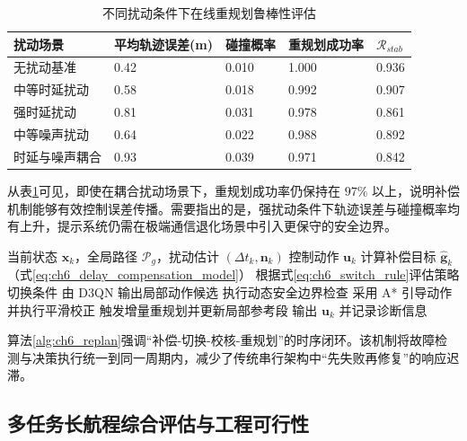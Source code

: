 \begin{table}[H]
\centering
\small
\caption{不同扰动条件下在线重规划鲁棒性评估}
\label{tab:ch6_robustness}
\begin{tabular}{p{}p{}p{}p{}p{}}
\toprule
扰动场景 & 平均轨迹误差(m) & 碰撞概率 & 重规划成功率 & $\mathcal{R}_{stab}$ \\
\midrule
无扰动基准 & 0.42 & 0.010 & 1.000 & 0.936 \\
中等时延扰动 & 0.58 & 0.018 & 0.992 & 0.907 \\
强时延扰动 & 0.81 & 0.031 & 0.978 & 0.861 \\
中等噪声扰动 & 0.64 & 0.022 & 0.988 & 0.892 \\
时延与噪声耦合 & 0.93 & 0.039 & 0.971 & 0.842 \\
\bottomrule
\end{tabular}
\end{table}

从表\ref{tab:ch6_robustness}可见，即使在耦合扰动场景下，重规划成功率仍保持在 $97\%$ 以上，说明补偿机制能够有效控制误差传播。需要指出的是，强扰动条件下轨迹误差与碰撞概率均有上升，提示系统仍需在极端通信退化场景中引入更保守的安全边界。

\begin{algorithm}[H]
\caption{在线增量重规划与容错执行伪代码}
\label{alg:ch6_replan}
\begin{algorithmic}[1]
\REQUIRE 当前状态 $\mathbf{x}_k$，全局路径 $\mathcal{P}_g$，扰动估计 $(\Delta t_k,\mathbf{n}_k)$
\ENSURE 控制动作 $\mathbf{u}_k$
\STATE 计算补偿目标 $\hat{\mathbf{g}}_k$（式\eqref{eq:ch6_delay_compensation_model}）
\STATE 根据式\eqref{eq:ch6_switch_rule}评估策略切换条件
    \STATE 由 D3QN 输出局部动作候选
    \STATE 执行动态安全边界检查
\ELSE
    \STATE 采用 A* 引导动作并执行平滑校正
\ENDIF
{}
    \STATE 触发增量重规划并更新局部参考段
\ENDIF
\STATE 输出 $\mathbf{u}_k$ 并记录诊断信息
\end{algorithmic}
\end{algorithm}

算法\ref{alg:ch6_replan}强调“补偿-切换-校核-重规划”的时序闭环。该机制将故障检测与决策执行统一到同一周期内，减少了传统串行架构中“先失败再修复”的响应迟滞。

\subsection{多任务长航程综合评估与工程可行性}
\label{subsec:ch6_long_horizon}

